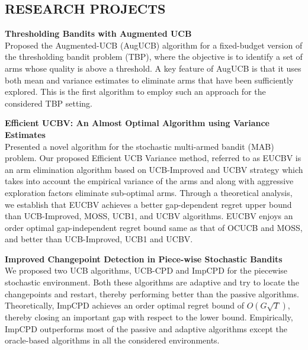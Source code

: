 \documentclass[margin,11pt]{res}
\begin{document}
\begin{resume}
\section{RESEARCH PROJECTS}
\par 

\textbf{Thresholding Bandits with Augmented UCB}\\
Proposed the Augmented-UCB (AugUCB) algorithm for a fixed-budget version of the thresholding bandit problem (TBP), where the objective is to identify a set of arms whose quality is above a threshold. A key feature of AugUCB is that it uses both mean and variance estimates to eliminate arms that have been sufficiently explored. This is the first algorithm to employ such an approach for the considered TBP setting.
\par

\textbf{Efficient UCBV: An Almost Optimal Algorithm using Variance Estimates}\\
Presented a novel algorithm for the stochastic multi-armed bandit (MAB) problem. Our proposed Efficient UCB Variance method, referred to as EUCBV is an arm elimination algorithm based on UCB-Improved and UCBV strategy which takes into account the empirical variance of the arms and along with aggressive exploration factors eliminate sub-optimal arms. Through a theoretical analysis, we establish that EUCBV achieves a better gap-dependent regret upper bound than UCB-Improved, MOSS, UCB1, and UCBV algorithms. EUCBV enjoys an order optimal gap-independent regret bound same as that of OCUCB and MOSS, and better than UCB-Improved, UCB1 and UCBV.
\par

\textbf{Improved Changepoint Detection in Piece-wise Stochastic Bandits}\\
We proposed two UCB algorithms, UCB-CPD and ImpCPD for the piecewise stochastic environment. Both these algorithms are adaptive and try to locate the changepoints and restart, thereby performing better than the passive algorithms. Theoretically, ImpCPD achieves an order optimal regret bound of $O\left(G\sqrt{T}\right)$, thereby closing an important gap with respect to the lower bound. Empirically, ImpCPD outperforms most of the passive and adaptive algorithms except the oracle-based algorithms in all the considered environments.


\end{resume}
\end{document}
